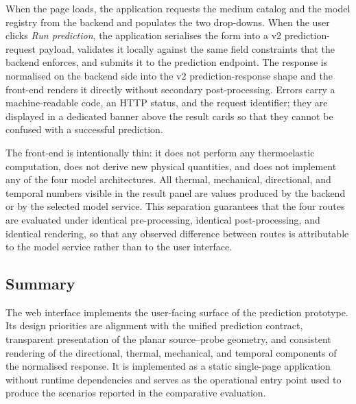 When the page loads, the application requests the medium catalog and
the model registry from the backend and populates the two drop-downs.
When the user clicks \emph{Run prediction}, the application serialises
the form into a v2 prediction-request payload, validates it locally
against the same field constraints that the backend enforces, and
submits it to the prediction endpoint. The response is normalised on
the backend side into the v2 prediction-response shape and the
front-end renders it directly without secondary post-processing.
Errors carry a machine-readable code, an HTTP status, and the request
identifier; they are displayed in a dedicated banner above the result
cards so that they cannot be confused with a successful prediction.

The front-end is intentionally thin: it does not perform any
thermoelastic computation, does not derive new physical quantities,
and does not implement any of the four model architectures. All
thermal, mechanical, directional, and temporal numbers visible in the
result panel are values produced by the backend or by the selected
model service. This separation guarantees that the four routes are
evaluated under identical pre-processing, identical post-processing,
and identical rendering, so that any observed difference between
routes is attributable to the model service rather than to the user
interface.

\subsection{Summary}

The web interface implements the user-facing surface of the prediction
prototype. Its design priorities are alignment with the unified
prediction contract, transparent presentation of the planar
source--probe geometry, and consistent rendering of the directional,
thermal, mechanical, and temporal components of the normalised
response. It is implemented as a static single-page application
without runtime dependencies and serves as the operational entry
point used to produce the scenarios reported in the comparative
evaluation.
